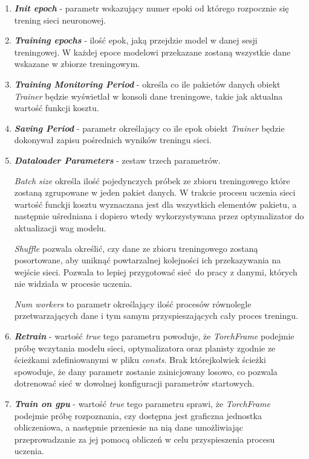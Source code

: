\begin{enumerate}
    \item \textbf{\textit{Init epoch}} - parametr wskazujący numer epoki od którego
    rozpocznie się trening sieci neuronowej.

    \item \textbf{\textit{Training epochs}} - ilość epok, jaką przejdzie model w danej
    sesji treningowej. W każdej epoce modelowi przekazane zostaną wszystkie dane
    wskazane w zbiorze treningowym.

    \item \textbf{\textit{Training Monitoring Period}} - określa co ile pakietów danych
    obiekt \textit{Trainer} będzie wyświetlał w konsoli dane treningowe, takie jak
    aktualna wartość funkcji kosztu.

    \item \textbf{\textit{Saving Period}} - parametr określający co ile epok
    obiekt \textit{Trainer} będzie dokonywał zapisu pośrednich wyników treningu sieci.

    \item \textbf{\textit{Dataloader Parameters}} - zestaw trzech parametrów.

    \textit{Batch size} określa ilość pojedynczych próbek ze zbioru treningowego które zostaną zgrupowane
    w jeden pakiet danych. W trakcie procesu uczenia sieci wartość funckji kosztu wyznaczana
    jest dla wszystkich elementów pakietu, a następnie uśredniana i dopiero wtedy
    wykorzystywana przez optymalizator do aktualizacji wag modelu.

    \textit{Shuffle} pozwala określić, czy dane ze zbioru treningowego zostaną
    posortowane, aby uniknąć powtarzalnej kolejności ich przekazywania na wejście
    sieci. Pozwala to lepiej przygotować sieć do pracy z danymi, których nie widziała
    w procesie uczenia.

    \textit{Num workers} to parametr  określający ilość procesów równolegle przetwarzających
    dane i tym samym przyspieszających cały proces treningu.

    \item \textbf{\textit{Retrain}} - wartość \textit{true} tego parametru powoduje, że
    \textit{TorchFrame} podejmie próbę wczytania modelu sieci, optymalizatora oraz
    planisty zgodnie ze ścieżkami zdefiniowanymi w pliku \textit{consts}. Brak którejkolwiek
    ścieżki spowoduje, że dany parametr zostanie zainicjowany losowo, co pozwala
    dotrenować sieć w dowolnej konfiguracji parametrów startowych.

    \item \textbf{\textit{Train on gpu}} - wartość \textit{true} tego parametru sprawi, że
    \textit{TorchFrame} podejmie próbę rozpoznania, czy dostępna jest graficzna jednostka
    obliczeniowa, a następnie przeniesie na nią dane umożliwiając przeprowadzanie
    za jej pomocą obliczeń w celu przyspieszenia procesu uczenia.


\end{enumerate}
